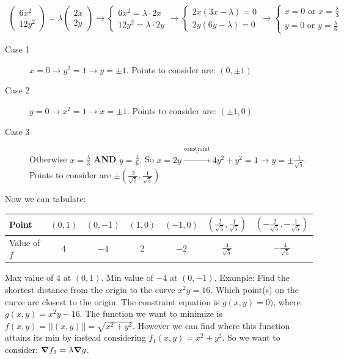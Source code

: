 \documentclass{article}
\newcommand{\n}{\leavevmode \newline} %
\newcommand{\nn}{\leavevmode \newline \newline} %
\numberwithin{equation}{subsection} %
\begin{document}
\begin{equation}
    \begin{split}
        \begin{pmatrix}
            6x^2 \\ 12y^2
        \end{pmatrix}
        = \lambda
        \begin{pmatrix}
            2x \\ 2y
        \end{pmatrix}
        \to
        \left\{
        \begin{array}{ll}
            6x^2 = \lambda \cdot 2x \\
            12y^2 = \lambda \cdot 2y
        \end{array}
        \right.
        \to 
        \left\{
        \begin{array}{ll}
            2x(3x-\lambda)=0 \\
            2y(6y-\lambda)=0
        \end{array}
        \right.
        \to
        \left\{
        \begin{array}{ll}
            x=0 \text{ or } x =\frac{\lambda}{3} \\
            y = 0 \text{ or } y =\frac{\lambda}{6}
        \end{array}
        \right.
    \end{split}
\end{equation}
\n
\begin{description}
    \item[Case 1] $x=0 \to y^2 = 1 \to y=\pm1$. Points to consider are: $(0,\pm1)$
    \item[Case 2] $y=0 \to x^2=1 \to x=\pm1$. Points to consider are: $(\pm1,0)$
    \item[Case 3] Otherwise $x=\frac{\lambda}{3}$ \textbf{AND} $y=\frac{\lambda}{6}$, So $x=2y \overbracket{\longrightarrow}^{\text{constraint}} 4y^2 + y^2 = 1 \to y= \pm \frac{1}{\sqrt{5}}$. Points to consider are $\pm(\frac{2}{\sqrt{5}},\frac{1}{\sqrt{5}})$
\end{description}
Now we can tabulate:

\begin{table}[H]
    \centering
    \begin{tabular}{l|c|c|c|c|c|c}
    Point & $(0,1)$ & $(0,-1)$ & $(1,0)$ & $(-1,0)$ & $(\frac{2}{\sqrt{5}}, \frac{1}{\sqrt{5}})$ & $(-\frac{2}{\sqrt{5}}, -\frac{1}{\sqrt{5}})$ \\
    \hline
    Value of $f$ & 4 & $-4$ & 2 & $-2$ & $\frac{4}{\sqrt{5}}$ & $-\frac{4}{\sqrt{5}}$
    \end{tabular}
\end{table}
\n
Max value of 4 at $(0,1)$. Min value of $-4$ at $(0,-1)$.
\nn
Example: Find the shortest distance from the origin to the curve $x^2y=16$. Which point(s) on the curve are closest to the origin. The constraint equation is $g(x,y)=0)$, where $g(x,y)=x^2y-16$. The function we want to minimize is $f(x,y)=||(x,y)||=\sqrt{x^2+y^2}$. However we can find where this function attains its min by instead considering $f_1(x,y)=x^2+y^2$. So we want to consider: $\grad f_1 = \lambda \grad g$.
\end{document}
